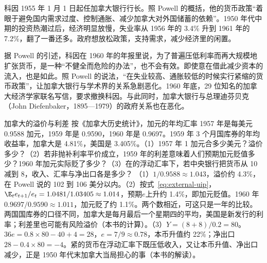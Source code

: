 科因 1955 年 1 月 1 日起任加拿大银行行长。照 Powell 的概括，他的货币政策“着眼于避免国内需求过度、控制通胀、减少加拿大对外国储蓄的依赖”\cite{powell2005}。1950 年代中期的投资热潮过后，经济明显放慢，失业率从 1956 年的 3.4\% 升到 1961 年的 7.2\%，翻了一番还多\cite{powell2005}。政府想放松政策，支持需求，减少经济里的闲置\cite{powell2005}。

据 Powell 的引述，科因在 1960 年的年报里说，为了普遍压低利率而再大规模地扩张货币，是一种“不健全而危险的办法”，也不会有效\cite{powell2005}。即使意在借此减少资本的流入，也是如此\cite{powell2005}。照 Powell 的说法，“在失业较高、通胀较低的时候实行紧缩的货币政策”，让加拿大银行与学术界的关系急剧恶化\cite{powell2005}。1960 年底，29 位知名的加拿大经济学家联名写信，要求撤换科因\cite{powell2005}。与此同时，加拿大银行与总理迪芬贝克（John Diefenbaker，1895—1979）的政府关系也在恶化\cite{powell2005,loc37}。

\begin{example}{加拿大的溢价与利差}\label{ex:mundell-canada}
按《加拿大历史统计》，加元的年均汇率 1957 年是每美元 0.9588 加元，1959 年是 0.9590，1960 年是 0.9697\cite{hsc1983}。1959 年 3 个月国库券的年均收益率，加拿大是 4.81\%，美国是 3.405\%\cite{hsc1983,erp1964}。（1）1957 年 1 加元合多少美元？溢价多少？（2）若非抛补利率平价成立，1959 年的利差意味着人们预期加元贬值多少？1960 年加元实际贬了多少？（3）在的浮动汇率下，若中央银行把货币从 10 减到 8，收入、汇率与净出口各是多少？
\solution
（1）$1/0.9588\approx1.043$，溢价约 4.3\%，在 Powell 说的 102 到 106 美分以内。（2）按式~\eqref{eq:external-uip}，$\E_t e_{t+1}/e_t=1.0481/1.03405\approx1.014$，预期$e$上升约 1.4\%，即加元贬值。1960 年$0.9697/0.9590\approx1.011$，加元贬了约 1.1\%。两个数相近，可这只是一年的比较。两国国库券的口径不同，加拿大是每月最后一个星期四的平均，美国是新发行的利率；利差里也可能有风险溢价（本书的计算）。（3）$Y=(8+8)/0.2=80$。$36e=0.8\times80-40+4=28$，$e=7/9\approx0.78$，本币升值约 22\%；净出口$28-0.4\times80=-4$。紧的货币在浮动汇率下既压低收入，又让本币升值、净出口减少，正是 1950 年代末加拿大当局担心的事（本书的解读）。
\end{example}


